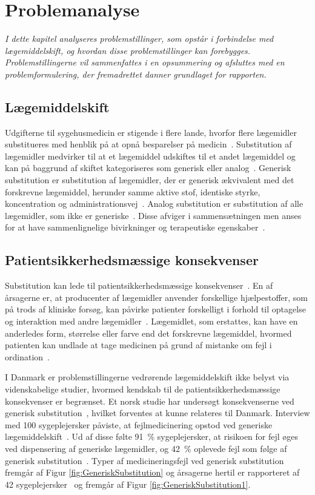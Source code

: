 \chapter{Problemanalyse}
\textit{I dette kapitel analyseres problemstillinger, som opstår i forbindelse med lægemiddelskift, og hvordan disse problemstillinger kan forebygges. Problemstillingerne vil sammenfattes i en opsummering og afsluttes med en problemformulering, der fremadrettet danner grundlaget for rapporten.}

\section{Lægemiddelskift}
Udgifterne til sygehusmedicin er stigende i flere lande, hvorfor flere lægemidler substitueres med henblik på at opnå besparelser på medicin~\citep{Ess2003,Johnston2011}. Substitution af lægemidler medvirker til at et lægemiddel udskiftes til et andet lægemiddel og kan på baggrund af skiftet kategoriseres som generisk eller analog~\citep{DanskSelskabforPatientsikkerhed2009, Kairi2017}. Generisk substitution er substitution af lægemidler, der er  generisk ækvivalent med det forskrevne lægemiddel, herunder samme aktive stof, identiske styrke, koncentration og administrationsvej~\citep{DanskSelskabforPatientsikkerhed2009, Kairi2017}. 
Analog substitution er substitution af alle lægemidler, som ikke er generiske~\citep{Kairi2017}. Disse afviger i sammensætningen men anses for at have sammenlignelige bivirkninger og terapeutiske egenskaber~\citep{DanskSelskabforPatientsikkerhed2009, Kairi2017}.


\section{Patientsikkerhedsmæssige konsekvenser} \label{sec:ProblemLaeg} 
Substitution kan lede til patientsikkerhedsmæssige konsekvenser~\citep{DanskSelskabforPatientsikkerhed2009}. En af årsagerne er, at producenter af lægemidler anvender forskellige hjælpestoffer, som på trods af kliniske forsøg, kan påvirke patienter forskelligt i forhold til optagelse og interaktion med andre lægemidler~\citep{Kairi2017}. Lægemidlet, som erstattes, kan have en anderledes form, størrelse eller farve end det forskrevne lægemiddel, hvormed patienten kan undlade at tage medicinen på grund af mistanke om fejl i ordination~\citep{Kairi2017}. 

I Danmark er problemstillingerne vedrørende lægemiddelskift ikke belyst via videnskabelige studier, hvormed kendskab til de patientsikkerhedsmæssige konsekvenser er begrænset. Et norsk studie har undersøgt konsekvenserne ved generisk substitution~\citep{Hakonsen2010}, hvilket forventes at kunne relateres til Danmark. Interview med 100 sygeplejersker påviste, at fejlmedicinering opstod ved generiske lægemiddelskift~\citep{Hakonsen2010}. Ud af disse følte 
91~\% sygeplejersker, at risikoen for fejl øges ved dispensering af generiske lægemidler, og 42~\% oplevede fejl som følge af generisk substitution~\citep{Hakonsen2010}.
Typer af medicineringsfejl ved generisk substitution fremgår af Figur \ref{fig:GeneriskSubstitution} og årsagerne hertil er rapporteret af 42 sygeplejersker~\citep{Hakonsen2010} og fremgår af Figur \ref{fig:GeneriskSubstitution1}.

